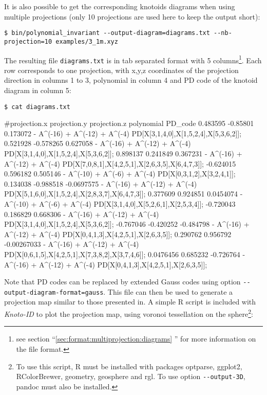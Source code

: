 It is also possible to get the corresponding knotoids diagrams when using multiple projections (only 10 projections are used here to keep the output short):
\begin{lstlisting}
$ bin/polynomial_invariant --output-diagram=diagrams.txt --nb-projection=10 examples/3_1m.xyz
\end{lstlisting}
The resulting file \lstinline{diagrams.txt} is in tab separated format with 5 columns\footnote{see section ``\ref{sec:format:multiprojection:diagrams} '' for more information on the file format.}. Each row corresponds to one projection, with x,y,z coordinates of the projection direction in columns 1 to 3, polynomial in column 4 and PD code of the knotoid diagram in column 5:
\begin{lstlisting}
$ cat diagrams.txt
\end{lstlisting}
\begin{lstlistingverysmall}
#projection.x  projection.y  projection.z  polynomial                    PD_code
0.483595       -0.85801      0.173072      - A^(-16) + A^(-12) + A^(-4)  PD[X[3,1,4,0],X[1,5,2,4],X[5,3,6,2]];
0.521928       -0.578265     0.627058      - A^(-16) + A^(-12) + A^(-4)  PD[X[3,1,4,0],X[1,5,2,4],X[5,3,6,2]];
0.898137       0.241849      0.367231      - A^(-16) + A^(-12) + A^(-4)  PD[X[7,0,8,1],X[4,2,5,1],X[2,6,3,5],X[6,4,7,3]];
-0.624015      0.596182      0.505146      - A^(-10) + A^(-6) + A^(-4)   PD[X[0,3,1,2],X[3,2,4,1]];
0.134038       -0.988518     -0.0697575    - A^(-16) + A^(-12) + A^(-4)  PD[X[5,1,6,0],X[1,5,2,4],X[2,8,3,7],X[6,4,7,3]];
0.377609       0.924851      0.0454074     - A^(-10) + A^(-6) + A^(-4)   PD[X[3,1,4,0],X[5,2,6,1],X[2,5,3,4]];
-0.720043      0.186829      0.668306      - A^(-16) + A^(-12) + A^(-4)  PD[X[3,1,4,0],X[1,5,2,4],X[5,3,6,2]];
-0.767046      -0.420252     -0.484798     - A^(-16) + A^(-12) + A^(-4)  PD[X[0,4,1,3],X[4,2,5,1],X[2,6,3,5]];
0.290762       0.956792      -0.00267033   - A^(-16) + A^(-12) + A^(-4)  PD[X[0,6,1,5],X[4,2,5,1],X[7,3,8,2],X[3,7,4,6]];
0.0476456      0.685232      -0.726764     - A^(-16) + A^(-12) + A^(-4)  PD[X[0,4,1,3],X[4,2,5,1],X[2,6,3,5]];
\end{lstlistingverysmall}
Note that PD codes can be replaced by extended Gauss codes using option \lstinline{--output-diagram-format=gauss}.
This file can then be used to generate a projection map similar to those presented in\cite{gound,gound2}.
A simple {\ttfamily R} script\cite{r2017} is included with {\it Knoto-ID} to plot the projection map, using voronoi tessellation on the sphere\footnote{To use this script, {\ttfamily R}\cite{r2017} must be installed with packages {\ttfamily optparse}\cite{optparse}, {\ttfamily ggplot2}\cite{wickham2009}, {\ttfamily RColorBrewer}\cite{rcolorbrewer}, {\ttfamily geometry}\cite{geometry}, {\ttfamily geosphere}\cite{geosphere} and {\ttfamily rgl}\cite{rgl}. To use option \lstinline{--output-3D}, pandoc\cite{pandoc} must also be installed.}:
